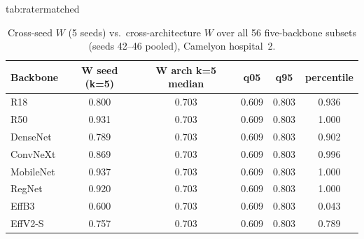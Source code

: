 \begin{table}[t]
\floatconts
  {tab:ratermatched}
  {\caption{Cross-seed $W$ (5 seeds) vs.\ cross-architecture $W$ over all 56 five-backbone subsets (seeds 42--46 pooled), Camelyon hospital~2.}}
  {\small
  \begin{tabular}{@{}lccccc@{}}
  \toprule
  Backbone & W seed (k=5) & W arch k=5 median & q05 & q95 & percentile \\
  \midrule
  R18 & 0.800 & 0.703 & 0.609 & 0.803 & 0.936 \\
  R50 & 0.931 & 0.703 & 0.609 & 0.803 & 1.000 \\
  DenseNet & 0.789 & 0.703 & 0.609 & 0.803 & 0.902 \\
  ConvNeXt & 0.869 & 0.703 & 0.609 & 0.803 & 0.996 \\
  MobileNet & 0.937 & 0.703 & 0.609 & 0.803 & 1.000 \\
  RegNet & 0.920 & 0.703 & 0.609 & 0.803 & 1.000 \\
  EffB3 & 0.600 & 0.703 & 0.609 & 0.803 & 0.043 \\
  EffV2-S & 0.757 & 0.703 & 0.609 & 0.803 & 0.789 \\
  \bottomrule
  \end{tabular}}
\end{table}
